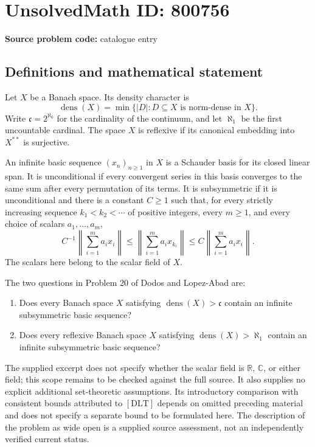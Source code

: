 \documentclass[11pt]{article}
\newcommand{\R}{\mathbb{R}}
\newcommand{\C}{\mathbb{C}}
\begin{document}
\section*{UnsolvedMath ID: 800756}
\textbf{Source problem code:} catalogue entry
\subsection{Definitions and mathematical statement}
Let \(X\) be a Banach space. Its density character is
\[
\operatorname{dens}(X)=\min\{\lvert D\rvert:D\subseteq X\text{ is norm-dense in }X\}.
\]
Write \(\mathfrak c=2^{\aleph_0}\) for the cardinality of the continuum, and let \(\aleph_1\) be the first uncountable cardinal. The space \(X\) is reflexive if its canonical embedding into \(X^{**}\) is surjective.

An infinite basic sequence \((x_n)_{n\geq1}\) in \(X\) is a Schauder basis for its closed linear span. It is unconditional if every convergent series in this basis converges to the same sum after every permutation of its terms. It is subsymmetric if it is unconditional and there is a constant \(C\geq1\) such that, for every strictly increasing sequence \(k_1<k_2<\cdots\) of positive integers, every \(m\geq1\), and every choice of scalars \(a_1,\ldots,a_m\),
\[
 C^{-1}\left\|\sum_{i=1}^m a_i x_i\right\|
 \leq \left\|\sum_{i=1}^m a_i x_{k_i}\right\|
 \leq C\left\|\sum_{i=1}^m a_i x_i\right\|.
\]
The scalars here belong to the scalar field of \(X\).

The two questions in Problem 20 of Dodos and Lopez-Abad are:
\begin{enumerate}
\item Does every Banach space \(X\) satisfying \(\operatorname{dens}(X)>\mathfrak c\) contain an infinite subsymmetric basic sequence?
\item Does every reflexive Banach space \(X\) satisfying \(\operatorname{dens}(X)>\aleph_1\) contain an infinite subsymmetric basic sequence?
\end{enumerate}
The supplied excerpt does not specify whether the scalar field is \(\R\), \(\C\), or either field; this scope remains to be checked against the full source. It also supplies no explicit additional set-theoretic assumptions. Its introductory comparison with consistent bounds attributed to \([\mathrm{DLT}]\) depends on omitted preceding material and does not specify a separate bound to be formulated here. The description of the problem as wide open is a supplied source assessment, not an independently verified current status.
\end{document}
